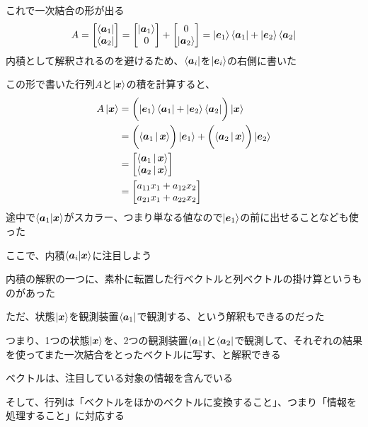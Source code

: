 \documentclass[../book_half_step_linear]{subfiles}
\begin{document}
これで一次結合の形が出る
\begin{equation*}
  A = \mqty[\bra{\vb*{a}_1} \\ \bra{\vb*{a}_2}] = \mqty[\Ket{\vb*{a}_1} \\ 0] + \mqty[0 \\ \Ket{\vb*{a}_2}] = \Ket{\vb*{e}_1} \bra{\vb*{a}_1} + \Ket{\vb*{e}_2} \bra{\vb*{a}_2}
\end{equation*}
内積として解釈されるのを避けるため、$\bra{\vb*{a}_i}$を$\ket{\vb*{e}_i}$の右側に書いた

\br

この形で書いた行列$A$と$\ket{\vb*{x}}$の積を計算すると、
\begin{align*}
  A\ket{\vb*{x}} & = \biggl( \Ket{\vb*{e}_1} \bra{\vb*{a}_1} + \Ket{\vb*{e}_2} \bra{\vb*{a}_2} \biggr) \ket{\vb*{x}}                             \\
                 & = \biggl( \Braket{\vb*{a}_1 | \vb*{x}} \biggr) \Ket{\vb*{e}_1} + \biggl( \Braket{\vb*{a}_2 | \vb*{x}} \biggr) \Ket{\vb*{e}_2} \\
                 & = \mqty[\Braket{\vb*{a}_1 | \vb*{x}}                                                                                          \\  \Braket{\vb*{a}_2 | \vb*{x}}] \\
                 & = \begin{bmatrix}
                       a_{11}x_1 + a_{12}x_2 \\
                       a_{21}x_1 + a_{22}x_2
                     \end{bmatrix}
\end{align*}
途中で$\braket{\vb*{a}_1|\vb*{x}}$がスカラー、つまり単なる値なので$\ket{\vb*{e}_1}$の前に出せることなども使った

\br

ここで、内積$\braket{\vb*{a}_i|\vb*{x}}$に注目しよう

内積の解釈の一つに、素朴に転置した行ベクトルと列ベクトルの掛け算というものがあった

ただ、状態$\ket{\vb*{x}}$を観測装置$\bra{\vb*{a}_1}$で観測する、という解釈もできるのだった

つまり、1つの状態$\ket{\vb*{x}}$を、2つの観測装置$\bra{\vb*{a}_1}$と$\bra{\vb*{a}_2}$で観測して、それぞれの結果を使ってまた一次結合をとったベクトルに写す、と解釈できる

\sectionline

ベクトルは、注目している対象の情報を含んでいる

そして、行列は「ベクトルをほかのベクトルに変換すること」、つまり「情報を処理すること」に対応する
\end{document}
